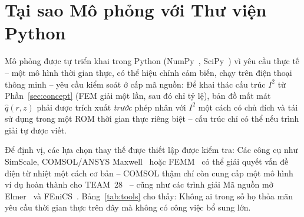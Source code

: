 \documentclass[a4paper, 10pt, conference]{ieeeconf}
\theoremstyle{remark}
\begin{document}
\section{Tại sao Mô phỏng với Thư viện Python}
\label{sec:tools}

Mô phỏng được tự triển khai trong Python (NumPy~\cite{harris2020numpy},
SciPy~\cite{virtanen2020scipy}) vì yêu cầu thực tế -- một mô hình thời gian thực,
có thể hiệu chỉnh cảm biến, chạy trên điện thoại thông minh -- yêu cầu kiểm soát
ở cấp mã nguồn: Để khai thác cấu trúc $I^2$ từ Phần~\ref{sec:concept} (FEM giải
một lần, sau đó chỉ tỷ lệ), bản đồ mất mát $\hat q(r,z)$ phải được trích xuất
\emph{trước} phép nhân với $I^2$ một cách có chủ đích và tái sử dụng trong một ROM
thời gian thực riêng biệt -- cấu trúc chỉ có thể nếu trình giải tự được viết.

Để định vị, các lựa chọn thay thế được thiết lập được kiểm tra: Các công cụ như
SimScale, COMSOL/ANSYS Maxwell~\cite{comsol_team28} hoặc FEMM~\cite{meeker2020femm}
có thể giải quyết vấn đề điện từ nhiệt một cách cơ bản -- COMSOL thậm chí còn cung
cấp một mô hình ví dụ hoàn thành cho TEAM~28~\cite{comsol_team28} -- cũng như các
trình giải Mã nguồn mở Elmer~\cite{malinen2013elmer} và FEniCS~\cite{langtangen2017fenics}.
Bảng~\ref{tab:tools} cho thấy: Không ai trong số họ thỏa mãn yêu cầu thời gian thực
trên đây mà không có công việc bổ sung lớn.
\end{document}
